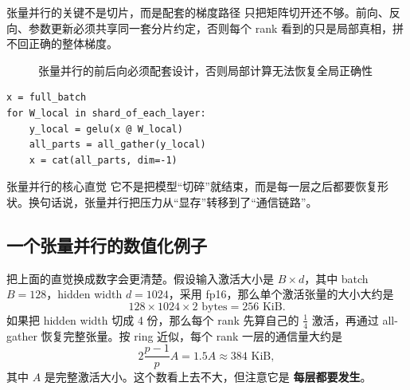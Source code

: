 \documentclass[a4paper]{article}
\begin{document}
\begin{importantbox}{张量并行的关键不是切片，而是配套的梯度路径}
只把矩阵切开还不够。前向、反向、参数更新必须共享同一套分片约定，否则每个 rank 看到的只是局部真相，拼不回正确的整体梯度。
\end{importantbox}

\begin{figure}[H]
\centering
{}
\caption{张量并行的前后向必须配套设计，否则局部计算无法恢复全局正确性}
\end{figure}

\begin{lstlisting}[caption={张量并行的极简理解},label={lst:tp}]
x = full_batch
for W_local in shard_of_each_layer:
    y_local = gelu(x @ W_local)
    all_parts = all_gather(y_local)
    x = cat(all_parts, dim=-1)
\end{lstlisting}

\begin{knowledgebox}{张量并行的核心直觉}
它不是把模型“切碎”就结束，而是每一层之后都要恢复形状。换句话说，张量并行把压力从“显存”转移到了“通信链路”。
\end{knowledgebox}

\subsection{一个张量并行的数值化例子}

把上面的直觉换成数字会更清楚。假设输入激活大小是 $B \times d$，其中 batch $B=128$，hidden width $d=1024$，采用 fp16，那么单个激活张量的大小大约是
\[
128 \times 1024 \times 2 \text{ bytes} = 256 \text{ KiB}.
\]
如果把 hidden width 切成 4 份，那么每个 rank 先算自己的 $\frac{1}{4}$ 激活，再通过 all-gather 恢复完整张量。按 ring 近似，每个 rank 一层的通信量大约是
\[
2\frac{p-1}{p}A = 1.5A \approx 384 \text{ KiB},
\]
其中 $A$ 是完整激活大小。这个数看上去不大，但注意它是 \textbf{每层都要发生}。
\end{document}

